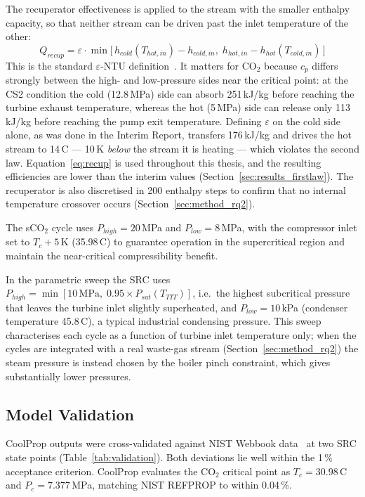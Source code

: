 \label{sec:method_recup}
The recuperator effectiveness is applied to the stream with the smaller
enthalpy capacity, so that neither stream can be driven past the inlet
temperature of the other:
\begin{equation}
Q_{recup} = \varepsilon \cdot \min\!\big[\,h_{cold}(T_{hot,in}) - h_{cold,in},\;
h_{hot,in} - h_{hot}(T_{cold,in})\,\big]
\label{eq:recup}
\end{equation}
This is the standard $\varepsilon$-NTU definition~\cite{Moran2018}. It
matters for CO$_2$ because $c_p$ differs strongly between the high- and
low-pressure sides near the critical point: at the CS2 condition the cold
(12.8\,MPa) side can absorb 251\,kJ/kg before reaching the turbine exhaust
temperature, whereas the hot (5\,MPa) side can release only 113\,kJ/kg before
reaching the pump exit temperature. Defining $\varepsilon$ on the cold side
alone, as was done in the Interim Report, transfers 176\,kJ/kg and drives the
hot stream to 14\,\textdegree C --- 10\,K \emph{below} the stream it is
heating --- which violates the second law. Equation~\eqref{eq:recup} is used
throughout this thesis, and the resulting efficiencies are lower than the
interim values (Section~\ref{sec:results_firstlaw}). The recuperator is also
discretised in 200 enthalpy steps to confirm that no internal temperature
crossover occurs (Section~\ref{sec:method_rq2}).

The sCO$_2$ cycle uses $P_{high} = 20$\,MPa and $P_{low} = 8$\,MPa, with
the compressor inlet set to $T_c + 5$\,K (35.98\,\textdegree C) to guarantee
operation in the supercritical region and maintain the near-critical
compressibility benefit.

In the parametric sweep the SRC uses $P_{high} = \min[10\,\text{MPa},\;
0.95 \times P_{sat}(T_{TIT})]$, i.e.\ the highest subcritical pressure that
leaves the turbine inlet slightly superheated, and $P_{low} = 10$\,kPa
(condenser temperature 45.8\,\textdegree C), a typical industrial condensing
pressure. This sweep characterises each cycle as a function of turbine inlet
temperature only; when the cycles are integrated with a real waste-gas stream
(Section~\ref{sec:method_rq2}) the steam pressure is instead chosen by the
boiler pinch constraint, which gives substantially lower pressures.

\subsection{Model Validation}

CoolProp outputs were cross-validated against NIST Webbook
data~\cite{Lemmon2018} at two SRC state points (Table~\ref{tab:validation}).
Both deviations lie well within the 1\,\% acceptance criterion. CoolProp
evaluates the CO$_2$ critical point as $T_c = 30.98$\,\textdegree C and
$P_c = 7.377$\,MPa, matching NIST REFPROP to within 0.04\,\%.

